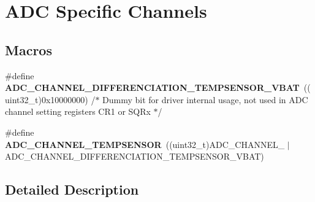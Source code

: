 \hypertarget{group___a_d_c_ex__channels}{}\section{A\+DC Specific Channels}
\label{group___a_d_c_ex__channels}
\subsection*{Macros}
\begin{DoxyCompactItemize}
\item 
\#define {\bfseries A\+D\+C\+\_\+\+C\+H\+A\+N\+N\+E\+L\+\_\+\+D\+I\+F\+F\+E\+R\+E\+N\+C\+I\+A\+T\+I\+O\+N\+\_\+\+T\+E\+M\+P\+S\+E\+N\+S\+O\+R\+\_\+\+V\+B\+AT}~((uint32\+\_\+t)0x10000000) /$\ast$ Dummy bit for driver internal usage, not used in A\+D\+C channel setting registers C\+R1 or S\+Q\+Rx $\ast$/\hypertarget{group___a_d_c_ex__channels_gad7f36d854757dcadfc577ef40e68aa7d}{}\label{group___a_d_c_ex__channels_gad7f36d854757dcadfc577ef40e68aa7d}

\item 
\#define {\bfseries A\+D\+C\+\_\+\+C\+H\+A\+N\+N\+E\+L\+\_\+\+T\+E\+M\+P\+S\+E\+N\+S\+OR}~((uint32\+\_\+t)A\+D\+C\+\_\+\+C\+H\+A\+N\+N\+E\+L\+\_ $\vert$ A\+D\+C\+\_\+\+C\+H\+A\+N\+N\+E\+L\+\_\+\+D\+I\+F\+F\+E\+R\+E\+N\+C\+I\+A\+T\+I\+O\+N\+\_\+\+T\+E\+M\+P\+S\+E\+N\+S\+O\+R\+\_\+\+V\+B\+AT)\hypertarget{group___a_d_c_ex__channels_ga8f0da1e8fa8504c92a368f6eb8e229b3}{}\label{group___a_d_c_ex__channels_ga8f0da1e8fa8504c92a368f6eb8e229b3}

\end{DoxyCompactItemize}


\subsection{Detailed Description}
